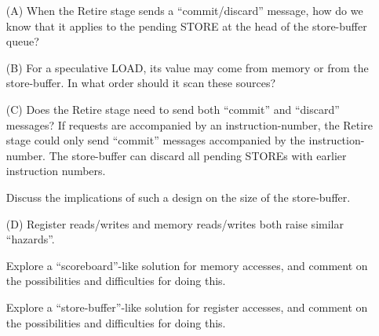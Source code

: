 \begin{itemize}

 \item[(A)] When the Retire stage sends a ``commit/discard'' message, how
       do we know that it applies to the pending STORE at the head of
       the store-buffer queue?

 \item[(B)] For a speculative LOAD, its value may come from memory or from
       the store-buffer.  In what order should it scan these sources?

 \item[(C)] Does the Retire stage need to send both ``commit'' and
       ``discard'' messages?  If requests are accompanied by an
       instruction-number, the Retire stage could only send ``commit''
       messages accompanied by the instruction-number.  The
       store-buffer can discard all pending STOREs with earlier
       instruction numbers.

       Discuss the implications of such a design on the size of the
       store-buffer.

 \item[(D)] Register reads/writes and memory reads/writes both raise
       similar ``hazards''.

       Explore a ``scoreboard''-like solution for memory accesses, and
       comment on the possibilities and difficulties for doing this.

       Explore a ``store-buffer''-like solution for register accesses,
       and comment on the possibilities and difficulties for doing
       this.

\end{itemize}





